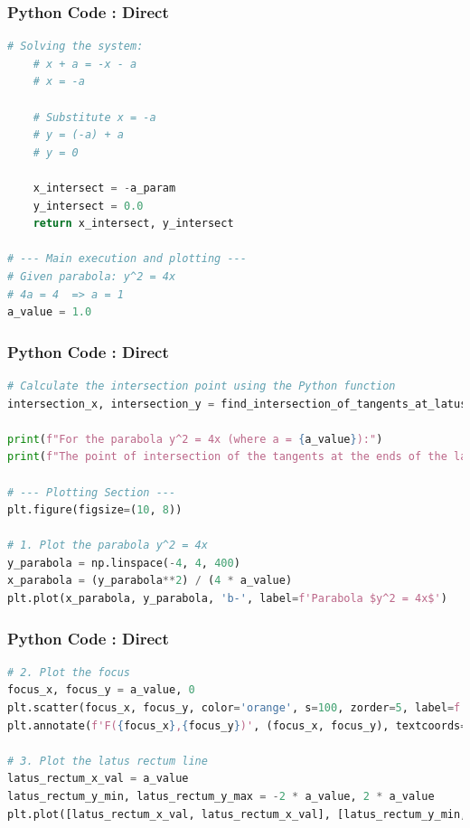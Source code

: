 \documentclass{beamer}
\begin{document}
\begin{frame}[fragile]
\frametitle{Python Code : Direct}
\begin{lstlisting}[language=Python]
    # Solving the system:
    # x + a = -x - a
    # x = -a

    # Substitute x = -a
    # y = (-a) + a
    # y = 0

    x_intersect = -a_param
    y_intersect = 0.0
    return x_intersect, y_intersect

# --- Main execution and plotting ---
# Given parabola: y^2 = 4x
# 4a = 4  => a = 1
a_value = 1.0
\end{lstlisting}
\end{frame}

\begin{frame}[fragile]
\frametitle{Python Code : Direct}
\begin{lstlisting}[language=Python]
# Calculate the intersection point using the Python function
intersection_x, intersection_y = find_intersection_of_tangents_at_latus_rectum_ends(a_value)

print(f"For the parabola y^2 = 4x (where a = {a_value}):")
print(f"The point of intersection of the tangents at the ends of the latus rectum is ({intersection_x:.2f}, {intersection_y:.2f})")

# --- Plotting Section ---
plt.figure(figsize=(10, 8))

# 1. Plot the parabola y^2 = 4x
y_parabola = np.linspace(-4, 4, 400)
x_parabola = (y_parabola**2) / (4 * a_value)
plt.plot(x_parabola, y_parabola, 'b-', label=f'Parabola $y^2 = 4x$')
\end{lstlisting}
\end{frame}

\begin{frame}[fragile]
\frametitle{Python Code : Direct}
\begin{lstlisting}[language=Python]
# 2. Plot the focus
focus_x, focus_y = a_value, 0
plt.scatter(focus_x, focus_y, color='orange', s=100, zorder=5, label=f'Focus ({focus_x}, {focus_y})')
plt.annotate(f'F({focus_x},{focus_y})', (focus_x, focus_y), textcoords="offset points", xytext=(5,5), ha='left')

# 3. Plot the latus rectum line
latus_rectum_x_val = a_value
latus_rectum_y_min, latus_rectum_y_max = -2 * a_value, 2 * a_value
plt.plot([latus_rectum_x_val, latus_rectum_x_val], [latus_rectum_y_min, latus_rectum_y_max], 'k-', label='Latus Rectum (x=1)')
\end{lstlisting}
\end{frame}
\end{document}
